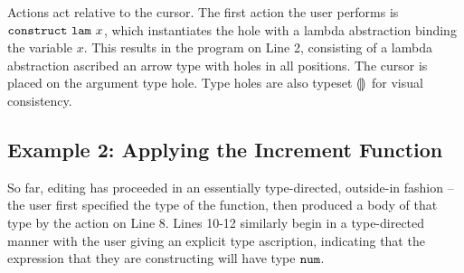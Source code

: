 Actions act relative to the cursor. The first action the user performs is $\mathtt{construct}~\mathtt{lam}~x$, which instantiates the hole with a lambda abstraction binding the variable $x$. This results in the program on Line 2, consisting of a lambda abstraction ascribed an arrow type with holes in all positions. The cursor is placed on the argument type hole. Type holes are also typeset $\llparenthesis\rrparenthesis$ for visual consistency. 

\subsection{Example 2: Applying the Increment Function}
So far, editing has proceeded in an essentially type-directed, outside-in fashion -- the user first specified the type of the function, then produced a body of that type by the action on Line 8. Lines 10-12 similarly begin in a type-directed manner with the user giving an explicit type ascription, indicating that the expression that they are constructing will have type $\texttt{num}$. 



